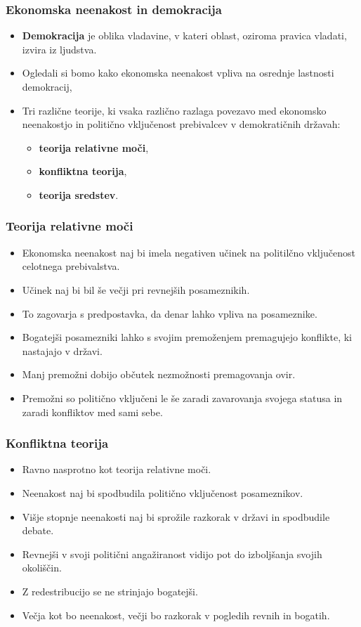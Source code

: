 \documentclass[10pt]{beamer}
\begin{document}
\begin{frame}
\frametitle{Ekonomska neenakost in demokracija}
\begin{itemize}
\item \textbf{Demokracija} je oblika vladavine, v kateri oblast, oziroma pravica vladati, izvira iz ljudstva.
\item Ogledali si bomo kako ekonomska neenakost vpliva na osrednje lastnosti demokracij,
\item Tri različne teorije, ki vsaka različno razlaga povezavo med ekonomsko neenakostjo in politično vključenost prebivalcev v demokratičnih državah:
	\begin{itemize}
	\item \textbf{teorija relativne moči},
	\item \textbf{konfliktna teorija},
	\item \textbf{teorija sredstev}.
	\end{itemize}
\end{itemize}
\end{frame}

\begin{frame}
\frametitle{Teorija relativne moči}
\begin{itemize}
\item Ekonomska neenakost naj bi imela negativen učinek na politilčno vključenost celotnega prebivalstva.
\item Učinek naj bi bil še večji pri revnejših posameznikih.
\item To zagovarja s predpostavka, da denar lahko vpliva na posameznike.
\item Bogatejši posamezniki lahko s svojim premoženjem premagujejo konflikte, ki nastajajo v državi.
\item Manj premožni dobijo občutek nezmožnosti premagovanja ovir.
\item Premožni so politično vključeni le še zaradi zavarovanja svojega statusa in zaradi konfliktov med sami sebe.
\end{itemize}
\end{frame}

\begin{frame}
\frametitle{Konfliktna teorija}
\begin{itemize}
\item Ravno nasprotno kot teorija relativne moči.
\item Neenakost naj bi spodbudila politično vključenost posameznikov.
\item Višje stopnje neenakosti naj bi sprožile razkorak v državi in spodbudile debate.
\item Revnejši v svoji politični angažiranost vidijo pot do izboljšanja svojih okoliščin.
\item Z redestribucijo se ne strinjajo bogatejši.
\item Večja kot bo neenakost, večji bo razkorak v pogledih revnih in bogatih.
\end{itemize}
\end{frame}
\end{document}
